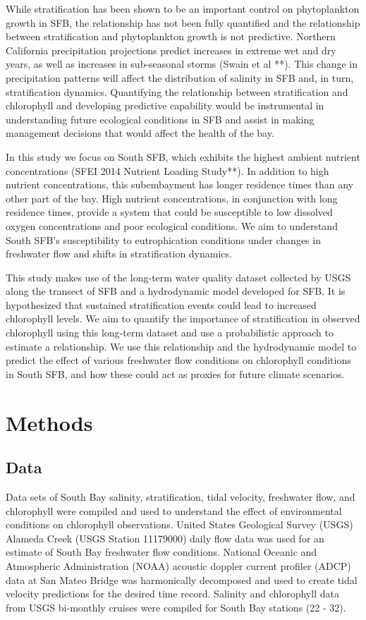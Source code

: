 \documentclass[preprint,review,12pt]{elsarticle}
\begin{document}
While stratification has been shown to be an important control on phytoplankton growth in SFB, the relationship has not been fully quantified and the relationship between stratification and phytoplankton growth is not predictive. Northern California precipitation projections predict increases in extreme wet and dry years, as well as increases in sub-seasonal storms (Swain et al **). This change in precipitation patterns will affect the distribution of salinity in SFB and, in turn, stratification dynamics. Quantifying the relationship between stratification and chlorophyll and developing predictive capability would be instrumental in understanding future ecological conditions in SFB and assist in making management decisions that would affect the health of the bay. 

In this study we focus on South SFB, which exhibits the highest ambient nutrient concentrations (SFEI 2014 Nutrient Loading Study**). In addition to high nutrient concentrations, this subembayment has longer residence times than any other part of the bay. High nutrient concentrations, in conjunction with long residence times, provide a system that could be susceptible to low dissolved oxygen concentrations and poor ecological conditions. We aim to understand South SFB's susceptibility to eutrophication conditions under changes in freshwater flow and shifts in stratification dynamics.

This study makes use of the long-term water quality dataset collected by USGS along the transect of SFB and a hydrodynamic model developed for SFB. It is hypothesized that sustained stratification events could lead to increased chlorophyll levels. We aim to quantify the importance of stratification in observed chlorophyll using this long-term dataset and use a probabilistic approach to estimate a relationship. We use this relationship and the hydrodynamic model to predict the effect of various freshwater flow conditions on chlorophyll conditions in South SFB, and how these could act as proxies for future climate scenarios.  

\section{Methods}\label{S:methods}
\subsection{Data}\label{S:data}
Data sets of South Bay salinity, stratification, tidal velocity, freshwater flow, and chlorophyll were compiled and used to understand the effect of environmental conditions on chlorophyll observations. United States Geological Survey (USGS) Alameda Creek (USGS Station 11179000) daily flow data was used for an estimate of South Bay freshwater flow conditions. National Oceanic and Atmospheric Administration (NOAA) acoustic doppler current profiler (ADCP) data at San Mateo Bridge was harmonically decomposed and used to create tidal velocity predictions for the desired time record. Salinity and chlorophyll data from USGS bi-monthly cruises were compiled for South Bay stations (22 - 32).  
\end{document}
